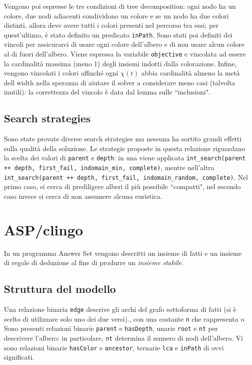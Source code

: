 \documentclass{report}
\begin{document}
Vengono poi espresse le tre condizioni di tree decomposition: ogni nodo ha un colore, due nodi adiacenti condividono un colore e se un nodo ha due colori distinti,
allora deve avere tutti i colori presenti nel percorso tra essi; per quest'ultimo, è stato definito un predicato \texttt{inPath}. Sono stati poi definiti dei vincoli per assicurarci
di usare ogni colore dell'albero e di non usare alcun colore al di fuori dell'albero. Viene espressa la variabile \texttt{objective} e vincolata ad essere la cardinalità massima
(meno 1) degli insiemi indotti dalla colorazione. Infine, vengono vincolati i colori affinché ogni $\chi(t)$ abbia cardinalità almeno la metà dell width nella speranza di aiutare
il solver a considerare meno casi (talvolta inutili): la correttezza del vincolo è data dal lemma sulle ``inclusioni".

\section{Search strategies}
Sono state provate diverse search strategies ma nessuna ha sortito grandi effetti sulla qualità della soluzione. Le strategie proposte in questa relazione riguardano
la scelta dei valori di \texttt{parent} e \texttt{depth}: in una viene applicata \texttt{int\_search(parent ++ depth, first\_fail, indomain\_min, complete)}, mentre
nell'altra \texttt{int\_search(parent ++ depth, first\_fail, indomain\_random, complete)}. Nel primo caso, si cerca di prediligere alberi il più possibile ``compatti", nel
secondo caso invece si cerca di non assumere alcuna euristica.

\chapter{ASP/clingo}

In un programma Answer Set vengono descritti un insieme di fatti e un insieme di regole di deduzione al fine di produrre un \textit{insieme stabile}.

\section{Struttura del modello}

Una relazione binaria \texttt{edge} descrive gli archi del grafo sottoforma di fatti (si è scelto di utilizzare solo uno dei due versi)., con una costante \texttt{n}
che rappresenta $n$ Sono presenti relazioni binarie \texttt{parent} e \texttt{hasDepth}, unarie \texttt{root} e \texttt{nt} per descrivere l'albero: in particolare,
\texttt{nt} determina il numero di nodi dell'albero. Vi sono relazioni binarie \texttt{hasColor} e \texttt{ancestor}, ternarie \texttt{lca} e \texttt{inPath} di ovvi significati.
\ \\
\ \\
\end{document}
